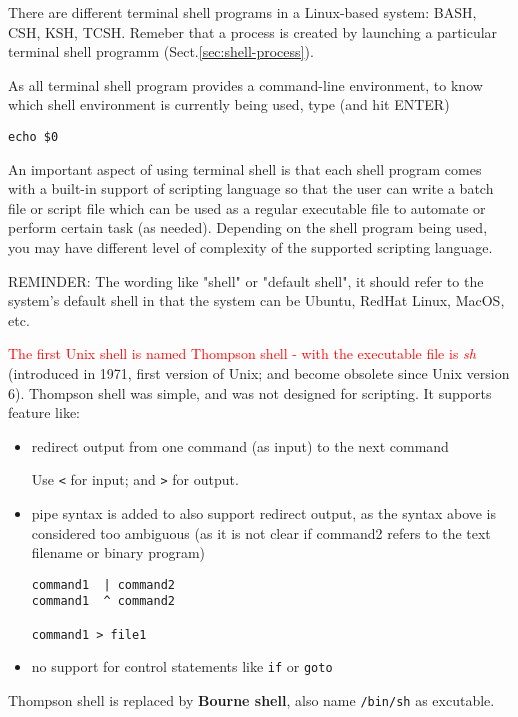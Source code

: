 There are different terminal shell programs in a Linux-based system:
BASH, CSH, KSH, TCSH.  Remeber that a process is created by launching a
particular terminal shell programm (Sect.\ref{sec:shell-process}).

As all terminal shell program provides a command-line environment,
to know which shell environment is currently being used, type (and hit ENTER)
\begin{verbatim}
echo $0
\end{verbatim}

An important aspect of using terminal shell is that each shell program comes
with a built-in support of scripting language so that the user can write a batch
file or script file which can be used as a regular executable file to automate
or perform certain task (as needed). Depending on the shell program being used,
you may have different level of complexity of the supported scripting language.

REMINDER: The wording like "shell" or "default shell", it should refer to the
system's default shell in that the system can be Ubuntu, RedHat Linux, MacOS,
etc.

\textcolor{red}{The first Unix shell is named Thompson shell - with the
executable file is {\it sh}} (introduced in 1971, first version of Unix; and
become obsolete since Unix version 6). Thompson shell was simple, and was not
designed for scripting. It supports feature like:
\begin{itemize}
  \item redirect output from one command (as input) to the next command
  
  Use \verb!<! for input; and \verb!>! for output. 
  
  \item pipe syntax is added to also support redirect output, as the syntax
  above is considered too ambiguous (as it is not clear if command2 refers to
  the text filename or binary program)
  
\begin{verbatim}
command1  | command2
command1  ^ command2

command1 > file1
\end{verbatim}

  \item no support for control statements like \verb!if! or \verb!goto!
\end{itemize}
Thompson shell is replaced by {\bf Bourne shell}, also name \verb!/bin/sh! as
excutable.


